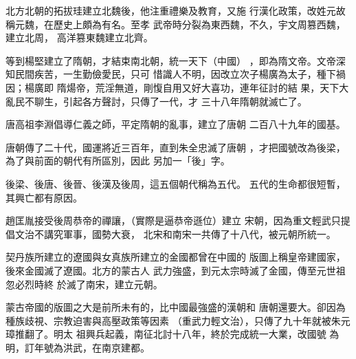 \documentclass[avery5371,grid]{flashcards}
\begin{document}
{北方北朝的拓拔珪建立北魏後，他注重禮樂及教育，又施
行漢化政策，改姓元故稱元魏，在歷史上頗為有名。至孝
武帝時分裂為東西魏，不久，宇文周篡西魏，建立北周，
高洋篡東魏建立北齊。} %
{} %

{等到楊堅建立了隋朝，才結束南北朝，統一天下（中國）
，即為隋文帝。文帝深知民間疾苦，一生勤儉愛民，只可
惜識人不明，因改立次子楊廣為太子，種下禍因；楊廣即
隋煬帝，荒淫無道，剛愎自用又好大喜功，連年征討的結
果，天下大亂民不聊生，引起各方聲討，只傳了一代，才
三十八年隋朝就滅亡了。} %
{} %




{唐高祖李淵倡導仁義之師，平定隋朝的亂事，建立了唐朝
二百八十九年的國基。} %
{} %

{唐朝傳了二十代，國運將近三百年，直到朱全忠滅了唐朝
，才把國號改為後梁，為了與前面的朝代有所區別，因此
另加一「後」字。} %
{} %

{後梁、後唐、後晉、後漢及後周，這五個朝代稱為五代。
五代的生命都很短暫，其興亡都有原因。} %
{} %

{趙匡胤接受後周恭帝的禪讓，（實際是逼恭帝遜位）建立
宋朝，因為重文輕武只提倡文治不講究軍事，國勢大衰，
北宋和南宋一共傳了十八代，被元朝所統一。} %
{} %

{契丹族所建立的遼國與女真族所建立的金國都曾在中國的
版圖上稱皇帝建國家，後來金國滅了遼國。北方的蒙古人
武力強盛，到元太宗時滅了金國，傳至元世祖忽必烈時終
於滅了南宋，建立元朝。} %
{} %

{蒙古帝國的版圖之大是前所未有的，比中國最強盛的漢朝和
唐朝還要大。卻因為種族歧視、宗教迫害與高壓政策等因素
（重武力輕文治），只傳了九十年就被朱元璋推翻了。明太
祖興兵起義，南征北討十八年，終於完成統一大業，改國號
為明，訂年號為洪武，在南京建都。} %
{} %
\end{document}

